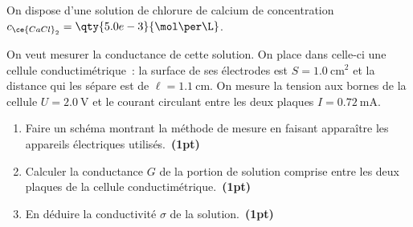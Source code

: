 On dispose d'une solution de chlorure de calcium de concentration
$c_{\ce{CaCl}_2}=\qty{5.0e-3}{\mol\per\L}$.

On veut mesurer la conductance de cette solution. On place dans celle-ci une
cellule conductimétrique~: la surface de ses électrodes est
$S=\qty{1.0}{\square\cm}$ et la distance qui les sépare est de
$\ell=\qty{1.1}{\cm}$.  On mesure la tension aux bornes de la cellule
$U=\qty{2.0}{\V}$ et le courant circulant entre les deux plaques
$I=\qty{0.72}{\mA}$.
\begin{enumerate}
    \item Faire un schéma montrant la méthode de mesure en faisant apparaître
          les appareils électriques utilisés.~\textbf{(1pt)}
    \item Calculer la conductance $G$ de la portion de solution comprise entre
          les deux plaques de la cellule conductimétrique.~\textbf{(1pt)}
    \item En déduire la conductivité $\sigma$ de la solution.~\textbf{(1pt)}
\end{enumerate}
